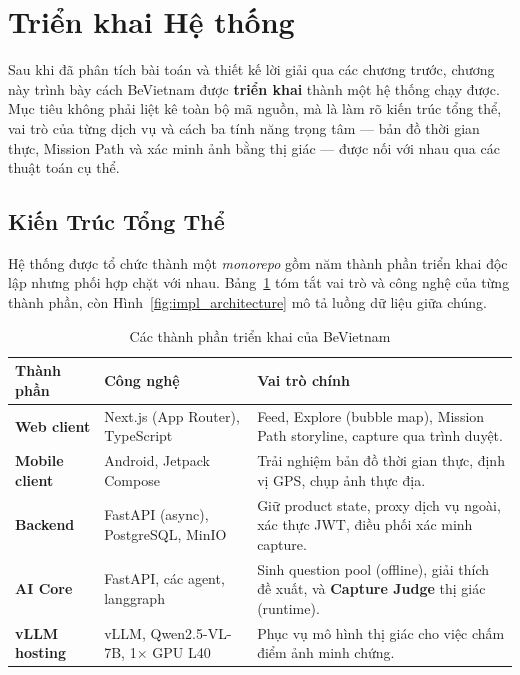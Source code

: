 \section{Triển khai Hệ thống}

Sau khi đã phân tích bài toán và thiết kế lời giải qua các chương trước,
chương này trình bày cách BeVietnam được \textbf{triển khai} thành một
hệ thống chạy được. Mục tiêu không phải liệt kê toàn bộ mã nguồn, mà là
làm rõ kiến trúc tổng thể, vai trò của từng dịch vụ và cách ba tính năng
trọng tâm --- bản đồ thời gian thực, Mission Path và xác minh ảnh bằng
thị giác --- được nối với nhau qua các thuật toán cụ thể.

\subsection{Kiến Trúc Tổng Thể}
\contrib

Hệ thống được tổ chức thành một \textit{monorepo} gồm năm thành phần
triển khai độc lập nhưng phối hợp chặt với nhau. Bảng~\ref{tab:impl_services}
tóm tắt vai trò và công nghệ của từng thành phần, còn
Hình~\ref{fig:impl_architecture} mô tả luồng dữ liệu giữa chúng.

\begin{table}[H]
\centering
\caption{Các thành phần triển khai của BeVietnam}
\label{tab:impl_services}
\begin{tabularx}{\textwidth}{>{\raggedright\arraybackslash}p{2.7cm} >{\raggedright\arraybackslash}p{3.3cm} X}
\toprule
\textbf{Thành phần} & \textbf{Công nghệ} & \textbf{Vai trò chính} \\
\midrule
\textbf{Web client} & Next.js (App Router), TypeScript & Feed, Explore (bubble map), Mission Path storyline, capture qua trình duyệt. \\
\textbf{Mobile client} & Android, Jetpack Compose & Trải nghiệm bản đồ thời gian thực, định vị GPS, chụp ảnh thực địa. \\
\textbf{Backend} & FastAPI (async), PostgreSQL, MinIO & Giữ product state, proxy dịch vụ ngoài, xác thực JWT, điều phối xác minh capture. \\
\textbf{AI Core} & FastAPI, các agent, langgraph & Sinh question pool (offline), giải thích đề xuất, và \textbf{Capture Judge} thị giác (runtime). \\
\textbf{vLLM hosting} & vLLM, Qwen2.5-VL-7B, 1$\times$ GPU L40 & Phục vụ mô hình thị giác cho việc chấm điểm ảnh minh chứng. \\
\bottomrule
\end{tabularx}
\end{table}

